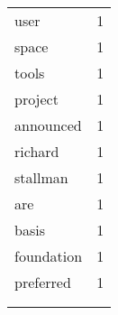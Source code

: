 \begin{center}
\begin{scriptsize}
\begin{tabular}{|ll|}
user           & 1\\%
space          & 1\\%
tools          & 1\\%
project        & 1\\%
announced      & 1\\%
richard        & 1\\%
stallman       & 1\\%
are            & 1\\%
basis          & 1\\%
foundation     & 1\\%
preferred      & 1\\%
&\\
&\\
\hline
\end{tabular}
\end{scriptsize}
\end{center}

